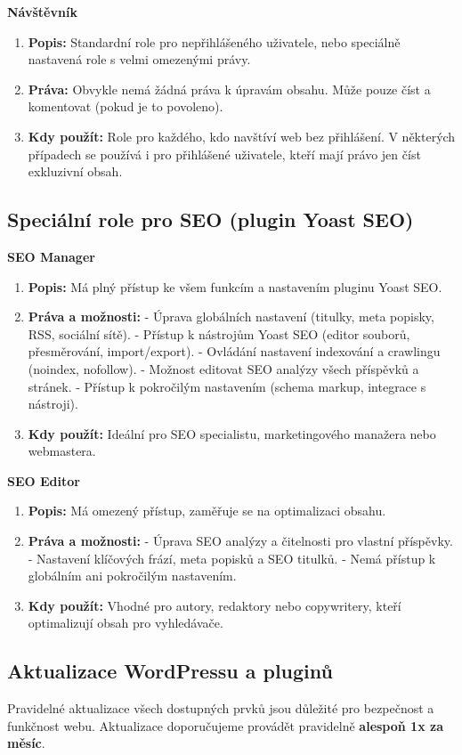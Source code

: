 \documentclass[12pt,a4paper]{article}
\begin{document}
	\textbf{Návštěvník}
	\begin{enumerate}
		\item \textbf{Popis:} Standardní role pro nepřihlášeného uživatele, nebo speciálně nastavená role s velmi omezenými právy.
		\item \textbf{Práva:} Obvykle nemá žádná práva k úpravám obsahu. Může pouze číst a komentovat (pokud je to povoleno).
		\item \textbf{Kdy použít:} Role pro každého, kdo navštíví web bez přihlášení. V některých případech se používá i pro přihlášené uživatele, kteří mají právo jen číst exkluzivní obsah.
	\end{enumerate}
	
	\subsection{Speciální role pro SEO (plugin Yoast SEO)}
	
	\textbf{SEO Manager}
	\begin{enumerate}
		\item \textbf{Popis:} Má plný přístup ke všem funkcím a nastavením pluginu Yoast SEO.
		\item \textbf{Práva a možnosti:}  
		- Úprava globálních nastavení (titulky, meta popisky, RSS, sociální sítě).  
		- Přístup k nástrojům Yoast SEO (editor souborů, přesměrování, import/export).  
		- Ovládání nastavení indexování a crawlingu (noindex, nofollow).  
		- Možnost editovat SEO analýzy všech příspěvků a stránek.  
		- Přístup k pokročilým nastavením (schema markup, integrace s nástroji).
		\item \textbf{Kdy použít:} Ideální pro SEO specialistu, marketingového manažera nebo webmastera.
	\end{enumerate}
	
	\textbf{SEO Editor}
	\begin{enumerate}
		\item \textbf{Popis:} Má omezený přístup, zaměřuje se na optimalizaci obsahu.
		\item \textbf{Práva a možnosti:}  
		- Úprava SEO analýzy a čitelnosti pro vlastní příspěvky.  
		- Nastavení klíčových frází, meta popisků a SEO titulků.  
		- Nemá přístup k globálním ani pokročilým nastavením.
		\item \textbf{Kdy použít:} Vhodné pro autory, redaktory nebo copywritery, kteří optimalizují obsah pro vyhledávače.
	\end{enumerate}
	
	\subsection{Aktualizace WordPressu a pluginů}
	Pravidelné aktualizace všech dostupných prvků jsou důležité pro bezpečnost a funkčnost webu. Aktualizace doporučujeme provádět pravidelně \textbf{alespoň 1x za měsíc}.
	
\end{document}
